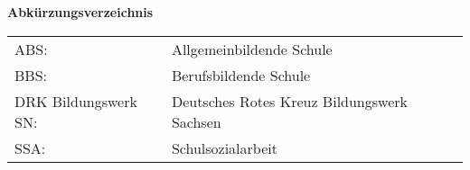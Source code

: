 \textbf{Abkürzungsverzeichnis}\\[1cm]

\begin{tabular}{lll}
ABS: & Allgemeinbildende Schule \\[0,5cm]
BBS: & Berufsbildende Schule \\[0,5cm]
DRK Bildungswerk SN: & Deutsches Rotes Kreuz Bildungswerk Sachsen \\[0,5cm]
SSA: & Schulsozialarbeit \\
\end{tabular}